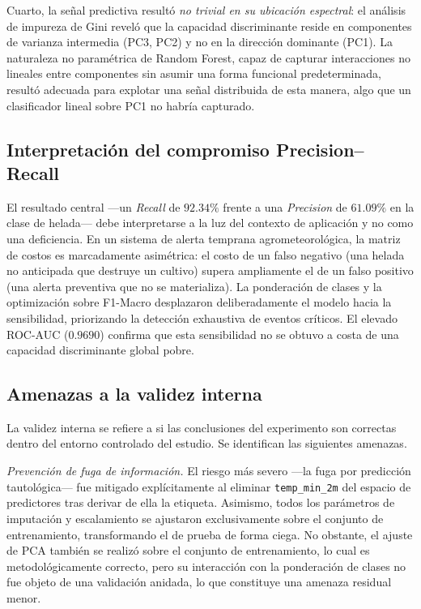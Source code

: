 Cuarto, la señal predictiva resultó \emph{no trivial en su ubicación espectral}:
el análisis de impureza de Gini reveló que la capacidad discriminante reside en
componentes de varianza intermedia (PC3, PC2) y no en la dirección dominante
(PC1). La naturaleza no paramétrica de Random Forest, capaz de capturar
interacciones no lineales entre componentes sin asumir una forma funcional
predeterminada, resultó adecuada para explotar una señal distribuida de esta
manera, algo que un clasificador lineal sobre PC1 no habría capturado.

\subsection{Interpretación del compromiso Precision--Recall}
El resultado central ---un \emph{Recall} de $92.34\%$ frente a una \emph{Precision}
de $61.09\%$ en la clase de helada--- debe interpretarse a la luz del contexto de
aplicación y no como una deficiencia. En un sistema de alerta temprana
agrometeorológica, la matriz de costos es marcadamente asimétrica: el costo de un
falso negativo (una helada no anticipada que destruye un cultivo) supera
ampliamente el de un falso positivo (una alerta preventiva que no se materializa).
La ponderación de clases y la optimización sobre F1-Macro desplazaron
deliberadamente el modelo hacia la sensibilidad, priorizando la detección
exhaustiva de eventos críticos. El elevado ROC-AUC ($0.9690$) confirma que esta
sensibilidad no se obtuvo a costa de una capacidad discriminante global pobre.

\subsection{Amenazas a la validez interna}
La validez interna se refiere a si las conclusiones del experimento son correctas
dentro del entorno controlado del estudio. Se identifican las siguientes
amenazas.

\emph{Prevención de fuga de información.} El riesgo más severo ---la fuga por
predicción tautológica--- fue mitigado explícitamente al eliminar
\texttt{temp\_min\_2m} del espacio de predictores tras derivar de ella la etiqueta.
Asimismo, todos los parámetros de imputación y escalamiento se ajustaron
exclusivamente sobre el conjunto de entrenamiento, transformando el de prueba de
forma ciega. No obstante, el ajuste de PCA también se realizó sobre el conjunto
de entrenamiento, lo cual es metodológicamente correcto, pero su interacción con
la ponderación de clases no fue objeto de una validación anidada, lo que
constituye una amenaza residual menor.

